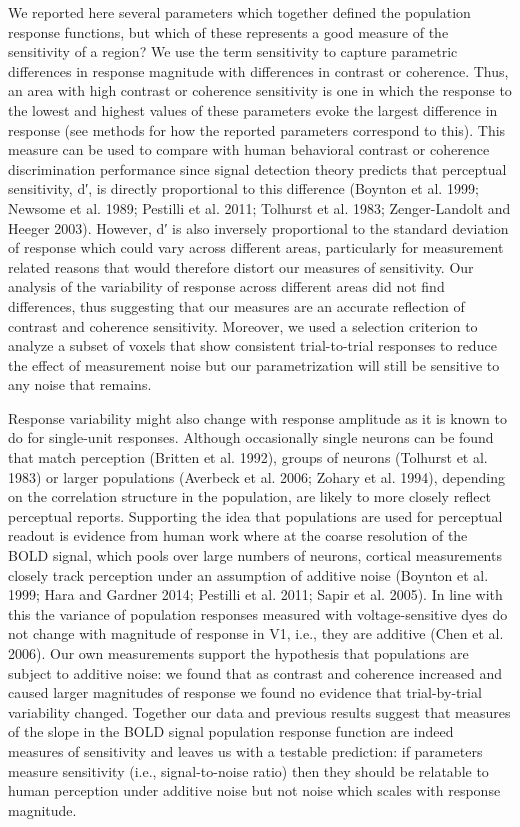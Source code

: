 \documentclass{report}
\begin{document}
We reported here several parameters which together defined the population response functions, but which of these represents a good measure of the sensitivity of a region? We use the term sensitivity to capture parametric differences in response magnitude with differences in contrast or coherence. Thus, an area with high contrast or coherence sensitivity is one in which the response to the lowest and highest values of these parameters evoke the largest difference in response (see methods for how the reported parameters correspond to this). This measure can be used to compare with human behavioral contrast or coherence discrimination performance since signal detection theory predicts that perceptual sensitivity, d′, is directly proportional to this difference (Boynton et al. 1999; Newsome et al. 1989; Pestilli et al. 2011; Tolhurst et al. 1983; Zenger-Landolt and Heeger 2003). However, d′ is also inversely proportional to the standard deviation of response which could vary across different areas, particularly for measurement related reasons that would therefore distort our measures of sensitivity. Our analysis of the variability of response across different areas did not find differences, thus suggesting that our measures are an accurate reflection of contrast and coherence sensitivity. Moreover, we used a selection criterion to analyze a subset of voxels that show consistent trial-to-trial responses to reduce the effect of measurement noise but our parametrization will still be sensitive to any noise that remains.

Response variability might also change with response amplitude as it is known to do for single-unit responses. Although occasionally single neurons can be found that match perception (Britten et al. 1992), groups of neurons (Tolhurst et al. 1983) or larger populations (Averbeck et al. 2006; Zohary et al. 1994), depending on the correlation structure in the population, are likely to more closely reflect perceptual reports. Supporting the idea that populations are used for perceptual readout is evidence from human work where at the coarse resolution of the BOLD signal, which pools over large numbers of neurons, cortical measurements closely track perception under an assumption of additive noise (Boynton et al. 1999; Hara and Gardner 2014; Pestilli et al. 2011; Sapir et al. 2005). In line with this the variance of population responses measured with voltage-sensitive dyes do not change with magnitude of response in V1, i.e., they are additive (Chen et al. 2006). Our own measurements support the hypothesis that populations are subject to additive noise: we found that as contrast and coherence increased and caused larger magnitudes of response we found no evidence that trial-by-trial variability changed. Together our data and previous results suggest that measures of the slope in the BOLD signal population response function are indeed measures of sensitivity and leaves us with a testable prediction: if parameters measure sensitivity (i.e., signal-to-noise ratio) then they should be relatable to human perception under additive noise but not noise which scales with response magnitude.
\end{document}

